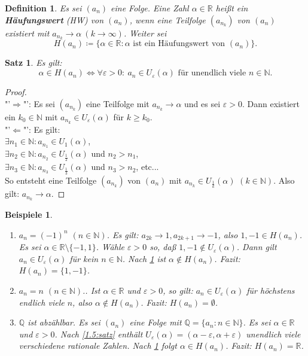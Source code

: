 \documentclass[12pt]{extreport} %
\newcommand{\N}{\mathbb{N}}
\newcommand{\Q}{\mathbb{Q}}
\newcommand{\R}{\mathbb{R}}
\theoremstyle{named}
\theoremstyle{itshape}
\newtheorem{satz}[unnamedtheorem]{Satz}
\newtheorem*{definition}{Definition}
\theoremstyle{normal}
\newtheorem*{beispiele}{Beispiele}
\begin{document}
\begin{definition}
	Es sei $(a_{n})$ eine Folge. Eine Zahl $\alpha \in \R$ hei{\ss}t ein \textbf{Häufungswert} (HW) von $(a_{n})$,
	wenn eine Teilfolge  $(a_{n_{k}})$ von $(a_{n})$ existiert mit $a_{n_{k}} \rightarrow \alpha ~(k \rightarrow \infty)$. Weiter sei	
	$$
	H(a_{n}) \coloneqq \{ \alpha \in \R: \alpha \text{ ist ein Häufungswert von } (a_{n}) \}.
	$$
	
\end{definition}


\begin{satz} \label{2.10:satz} Es gilt:
	$$
	 \alpha \in H(a_{n})  \iff \forall \varepsilon > 0: ~ a_{n} \in U_{\varepsilon}(\alpha) \text{ für unendlich viele }  n \in \N. 
	$$
\end{satz}

\begin{proof} ~\\
	"'$\Rightarrow$"': Es sei $(a_{n_{k}})$ eine Teilfolge mit $a_{n_{k}} \rightarrow \alpha$ und es sei $\varepsilon > 0$. Dann existiert ein $k_{0} \in \N$ mit
	$a_{n_{k}} \in U_{\varepsilon}(\alpha)$ für $k \geq k_{0}$. \\
	"'$\Leftarrow$"': Es gilt: \\
	$\exists n_{1} \in \N: a_{n_{1}} \in U_{1}(\alpha)$, \\
	$\exists n_{2} \in \N: a_{n_{2}} \in U_{\frac{1}{2}}(\alpha)$ und $n_{2} > n_{1}$, \\
	$\exists n_{3} \in \N: a_{n_{3}} \in U_{\frac{1}{3}}(\alpha)$ und $n_{3} > n_{2}$,  etc... \\
	So entsteht eine Teilfolge $(a_{n_{k}})$ von $(a_{n})$ mit $a_{n_{k}} \in U_{\frac{1}{k}}(\alpha)$ $(k \in \N)$.
	Also gilt: $a_{n_{k}} \rightarrow \alpha$. 
\end{proof}


\begin{beispiele}\
	\begin{enumerate}
		\item $a_{n} = (-1)^{n}$ $(n \in \N)$. Es gilt: $a_{2k} \rightarrow 1, a_{2k+1} \rightarrow -1$, also $1, -1 \in H(a_{n})$. 
		Es sei $\alpha \in \R\setminus \{-1,1\}$. Wähle $\varepsilon>0$ so, da{\ss} $1, -1 \notin U_{\varepsilon}(\alpha)$. Dann gilt $a_{n} \in U_{\varepsilon}(\alpha)$ für kein 
		$n \in \N$. Nach \ref{2.10:satz} ist $\alpha \notin H(a_{n})$. Fazit: $H(a_{n}) = \{ 1, -1 \}$.
		\item $a_{n} = n$ $(n \in \N)$.. Ist $\alpha \in \R$ und $\varepsilon > 0$, so gilt: $a_{n} \in U_{\varepsilon}(\alpha)$ für höchstens endlich viele $n$, 
		also $\alpha \notin H(a_{n})$. Fazit: $H(a_{n}) = \emptyset$.
		\item $\Q$ ist abzählbar. Es sei $(a_{n})$ eine Folge mit $\Q = \{a_{n}: n \in \N\}$. Es sei $\alpha \in \R$ und $\varepsilon > 0$. Nach {\ref{1.5:satz}} 
		enthält $U_{\varepsilon}(\alpha) = (\alpha - \varepsilon, \alpha + \varepsilon)$ unendlich viele verschiedene rationale Zahlen. Nach {\ref{2.10:satz}} folgt 
		$\alpha \in H(a_{n})$. Fazit: $H(a_{n}) = \R$.
	\end{enumerate}	
\end{beispiele}
\end{document}
